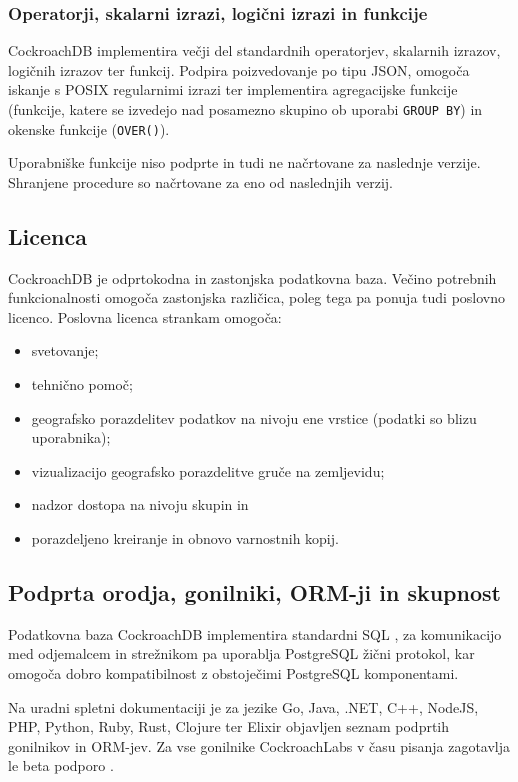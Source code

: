 \documentclass[a4paper, 12pt]{book}
\begin{document}
\subsubsection{Operatorji, skalarni izrazi, logični izrazi in funkcije}
CockroachDB implementira večji del standardnih operatorjev, skalarnih izrazov, logičnih izrazov ter funkcij. Podpira poizvedovanje po tipu JSON, omogoča iskanje s POSIX regularnimi izrazi ter implementira agregacijske funkcije (funkcije, katere se izvedejo nad posamezno skupino ob uporabi \texttt{GROUP BY}) in okenske funkcije (\texttt{OVER()}).

Uporabniške funkcije niso podprte in tudi ne načrtovane za naslednje verzije. Shranjene procedure so načrtovane za eno od naslednjih verzij.

\subsection{Licenca}

CockroachDB je odprtokodna in zastonjska podatkovna baza. Večino potrebnih funkcionalnosti omogoča zastonjska različica, poleg tega pa ponuja tudi poslovno licenco. Poslovna licenca strankam omogoča:

\begin{itemize}
    \item svetovanje;
    \item tehnično pomoč;
    \item geografsko porazdelitev podatkov na nivoju ene vrstice (podatki so blizu uporabnika);
    \item vizualizacijo geografsko porazdelitve gruče na zemljevidu;
    \item nadzor dostopa na nivoju skupin in
    \item porazdeljeno kreiranje in obnovo varnostnih kopij.
\end{itemize}

\subsection{Podprta orodja, gonilniki, ORM-ji in skupnost}

Podatkovna baza CockroachDB implementira standardni SQL \cite{CRDB-sql-standard}, za komunikacijo med odjemalcem in strežnikom pa uporablja PostgreSQL žični protokol, kar omogoča dobro kompatibilnost z obstoječimi PostgreSQL komponentami.

Na uradni spletni dokumentaciji je za jezike Go, Java, .NET, C++, NodeJS, PHP, Python, Ruby, Rust, Clojure ter Elixir objavljen seznam podprtih gonilnikov in ORM-jev. Za vse gonilnike CockroachLabs v času pisanja zagotavlja le beta podporo \cite{CRDB-meta-drivers-orms}.
\end{document}
